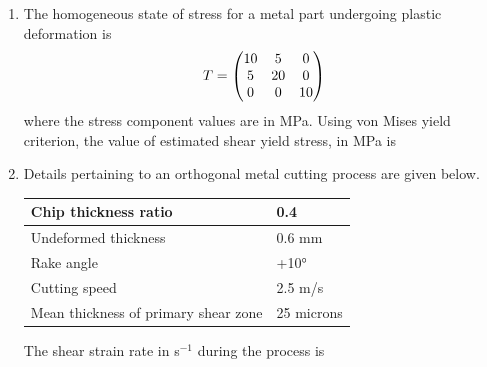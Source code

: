 \documentclass[journal,11pt,onecolumn]{IEEEtran}
\begin{document}
\begin{enumerate}[resume]

    \item The homogeneous state of stress for a metal part undergoing plastic deformation is
          \[T = \begin{pmatrix}10 & 5 & 0 \\ 5 & 20 & 0 \\ 0 & 0 & 10\end{pmatrix}\]
          where the stress component values are in MPa. Using von Mises yield criterion, the value of estimated shear yield stress, in MPa is

          \begin{enumerate}
          \end{enumerate}

    \item Details pertaining to an orthogonal metal cutting process are given below.

          \begin{table}[H]
              \centering
              \begin{tabular}{|l|l|}
                  \hline
                  Chip thickness ratio                 & 0.4        \\
                  \hline
                  Undeformed thickness                 & 0.6 mm     \\
                  \hline
                  Rake angle                           & +10°       \\
                  \hline
                  Cutting speed                        & 2.5 m/s    \\
                  \hline
                  Mean thickness of primary shear zone & 25 microns \\
                  \hline
              \end{tabular}
          \end{table}

          The shear strain rate in s$^{-1}$ during the process is

          \begin{enumerate}
          \end{enumerate}


\end{enumerate}
\end{document}

